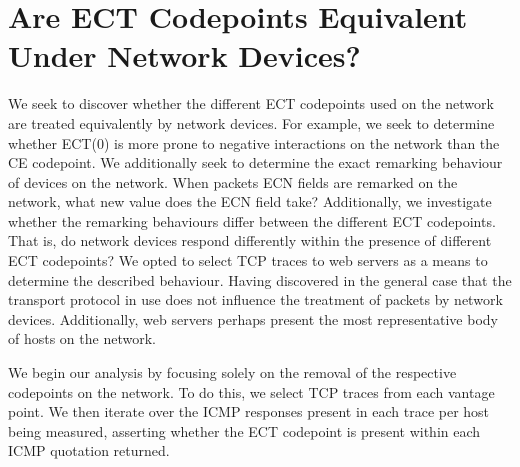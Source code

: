 \documentclass{l4proj}
\begin{document}
\section{Are ECT Codepoints Equivalent Under Network Devices?}
\label{sec:ectcodepoints}

We seek to discover whether the different ECT codepoints used on the network are treated equivalently by network devices. For example, we seek to determine whether ECT(0) is more prone to negative interactions on the network than the CE codepoint. We additionally seek to determine the exact remarking behaviour of devices on the network. When packets ECN fields are remarked on the network, what new value does the ECN field take? Additionally, we investigate whether the remarking behaviours differ between the different ECT codepoints. That is, do network devices respond differently within the presence of different ECT codepoints? We opted to select TCP traces to web servers as a means to determine the described behaviour. Having discovered in the general case that the transport protocol in use does not influence the treatment of packets by network devices. Additionally, web servers perhaps present the most representative body of hosts on the network.

We begin our analysis by focusing solely on the removal of the respective codepoints on the network. To do this, we select TCP traces from each vantage point. We then iterate over the ICMP responses present in each trace per host being measured, asserting whether the ECT codepoint is present within each ICMP quotation returned.
\end{document}
